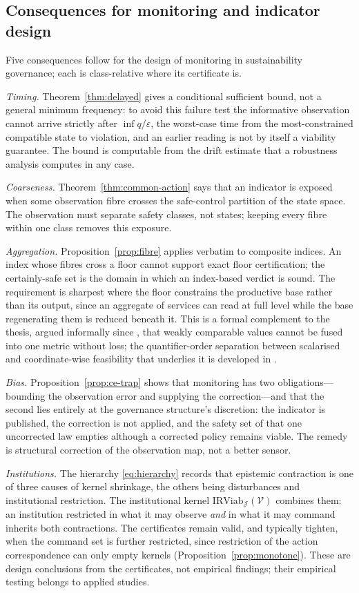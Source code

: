 \documentclass[11pt,a4paper]{article}
\theoremstyle{plain}
\theoremstyle{definition}
\theoremstyle{remark}
\newcommand{\IRViab}{\mathrm{IRViab}}
\newcommand{\cV}{\mathcal{V}}
\newcommand{\cJ}{\mathcal{J}}
\begin{document}
\subsection{Consequences for monitoring and indicator design}\label{sec:design}

Five consequences follow for the design of monitoring in sustainability governance; each is class-relative where its certificate is.

\emph{Timing.} Theorem~\ref{thm:delayed} gives a conditional sufficient bound, not a general minimum frequency: to avoid this failure test the informative observation cannot arrive strictly after $\inf q/\varepsilon$, the worst-case time from the most-constrained compatible state to violation, and an earlier reading is not by itself a viability guarantee. The bound is computable from the drift estimate that a robustness analysis computes in any case.

\emph{Coarseness.} Theorem~\ref{thm:common-action} says that an indicator is exposed when some observation fibre crosses the safe-control partition of the state space. The observation must separate safety classes, not states; keeping every fibre within one class removes this exposure.

\emph{Aggregation.} Proposition~\ref{prop:fibre} applies verbatim to composite indices. An index whose fibres cross a floor cannot support exact floor certification; the certainly-safe set is the domain in which an index-based verdict is sound. The requirement is sharpest where the floor constrains the productive base rather than its output, since an aggregate of services can read at full level while the base regenerating them is reduced beneath it. This is a formal complement to the thesis, argued informally since \citet{martinezalier1998}, that weakly comparable values cannot be fused into one metric without loss; the quantifier-order separation between scalarised and coordinate-wise feasibility that underlies it is developed in \citet{abaee2026aggregate}.

\emph{Bias.} Proposition~\ref{prop:ce-trap} shows that monitoring has two obligations---bounding the observation error and supplying the correction---and that the second lies entirely at the governance structure's discretion: the indicator is published, the correction is not applied, and the safety set of that one uncorrected law empties although a corrected policy remains viable. The remedy is structural correction of the observation map, not a better sensor.

\emph{Institutions.} The hierarchy \eqref{eq:hierarchy} records that epistemic contraction is one of three causes of kernel shrinkage, the others being disturbances and institutional restriction. The institutional kernel $\IRViab_\cJ(\cV)$ combines them: an institution restricted in what it may observe \emph{and} in what it may command inherits both contractions. The certificates remain valid, and typically tighten, when the command set is further restricted, since restriction of the action correspondence can only empty kernels (Proposition~\ref{prop:monotone}). These are design conclusions from the certificates, not empirical findings; their empirical testing belongs to applied studies.
\end{document}
